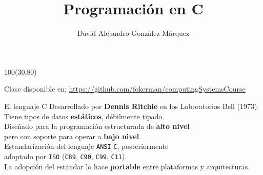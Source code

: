 \documentclass[aspectratio=169]{beamer}
\title{\Huge Programación en C}
\author{David Alejandro González Márquez}
\date{}
\begin{document}
\begin{frame}[plain]
    \titlepage
    \begin{textblock}{100}(30,80)
    \begin{tcolorbox}[size=small,width=\textwidth,colback={gray!30},title={}]
    \begin{center}
     \scriptsize Clase disponible en: \url{https://github.com/fokerman/computingSystemsCourse}
    \end{center}
    \end{tcolorbox}
    \end{textblock}
\end{frame}


\begin{frame}[fragile]{El lenguaje C}
    Desarrollado por \textbf{Dennis Ritchie} en los Laboratorios Bell (1973).\\
    \bigskip
    Tiene tipos de datos \textbf{estáticos}, débilmente tipado.\\
    \bigskip
    Diseñado para la programación estructurada de \textbf{alto nivel}\\
    pero con soporte para operar a \textbf{bajo nivel}.\\
    \pause
    \bigskip
    Estandarización del lenguaje \texttt{ANSI} \texttt{C}, posteriormente\\
    adoptado por \texttt{ISO} (\texttt{C89}, \texttt{C90}, \texttt{C99}, \texttt{C11}).\\
    \bigskip
    La adopción del estándar lo hace \textbf{portable} entre plataformas y arquitecturas.\\
\end{frame}
\end{document}
